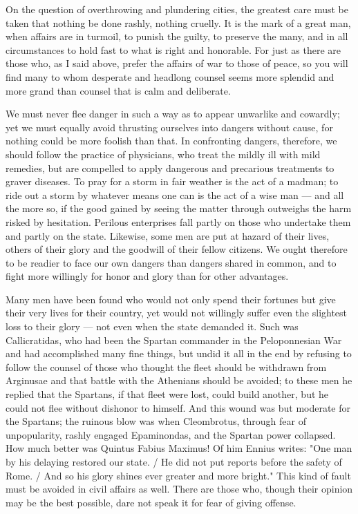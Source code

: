  On the question of overthrowing and plundering cities, the greatest care must be taken that nothing be done rashly, nothing cruelly. It is the mark of a great man, when affairs are in turmoil, to punish the guilty, to preserve the many, and in all circumstances to hold fast to what is right and honorable. For just as there are those who, as I said above, prefer the affairs of war to those of peace, so you will find many to whom desperate and headlong counsel seems more splendid and more grand than counsel that is calm and deliberate.

 We must never flee danger in such a way as to appear unwarlike and cowardly; yet we must equally avoid thrusting ourselves into dangers without cause, for nothing could be more foolish than that. In confronting dangers, therefore, we should follow the practice of physicians, who treat the mildly ill with mild remedies, but are compelled to apply dangerous and precarious treatments to graver diseases. To pray for a storm in fair weather is the act of a madman; to ride out a storm by whatever means one can is the act of a wise man — and all the more so, if the good gained by seeing the matter through outweighs the harm risked by hesitation. Perilous enterprises fall partly on those who undertake them and partly on the state. Likewise, some men are put at hazard of their lives, others of their glory and the goodwill of their fellow citizens. We ought therefore to be readier to face our own dangers than dangers shared in common, and to fight more willingly for honor and glory than for other advantages.

 Many men have been found who would not only spend their fortunes but give their very lives for their country, yet would not willingly suffer even the slightest loss to their glory — not even when the state demanded it. Such was Callicratidas, who had been the Spartan commander in the Peloponnesian War and had accomplished many fine things, but undid it all in the end by refusing to follow the counsel of those who thought the fleet should be withdrawn from Arginusae and that battle with the Athenians should be avoided; to these men he replied that the Spartans, if that fleet were lost, could build another, but he could not flee without dishonor to himself. And this wound was but moderate for the Spartans; the ruinous blow was when Cleombrotus, through fear of unpopularity, rashly engaged Epaminondas, and the Spartan power collapsed. How much better was Quintus Fabius Maximus! Of him Ennius writes: "One man by his delaying restored our state. / He did not put reports before the safety of Rome. / And so his glory shines ever greater and more bright." This kind of fault must be avoided in civil affairs as well. There are those who, though their opinion may be the best possible, dare not speak it for fear of giving offense.

